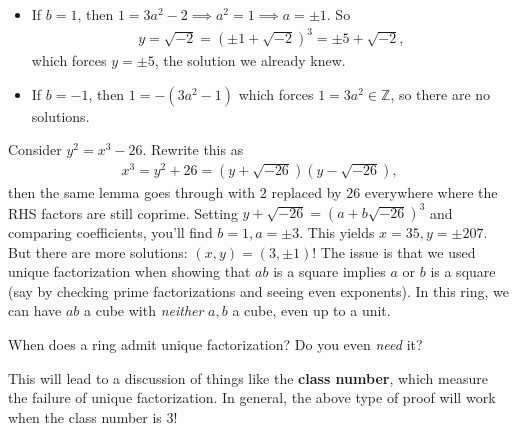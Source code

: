 \begin{example}[Fermat]
\begin{itemize}
\item
  If \(b=1\), then \(1 = 3a^2 -2 \implies a^2 = 1 \implies a = \pm 1\).
  So
  \begin{align*}
  y = \sqrt{-2} = (\pm 1 + \sqrt{-2} )^3 = \pm 5 + \sqrt{-2}
  ,\end{align*}
  which forces \(y=\pm 5\), the solution we already knew.
\item
  If \(b = -1\), then \(1 = -(3a^2 - 1)\) which forces
  \(1=3a^2 \in {\mathbb{Z}}\), so there are no solutions.
\end{itemize}

\end{example}

\begin{example}[?]

Consider \(y^2 = x^3 - 26\). Rewrite this as
\begin{align*}
x^3 = y^2 + 26 = (y + \sqrt{-26} )(y - \sqrt{-26} )
,\end{align*}
then the same lemma goes through with \(2\) replaced by \(26\)
everywhere where the RHS factors are still coprime. Setting
\(y + \sqrt{-26} = (a + b \sqrt{-26} )^3\) and comparing coefficients,
you'll find \(b=1, a = \pm 3\). This yields \(x=35, y=\pm 207\). But
there are more solutions: \((x, y) = (3, \pm 1)\)! The issue is that we
used unique factorization when showing that \(ab\) is a square implies
\(a\) or \(b\) is a square (say by checking prime factorizations and
seeing even exponents). In this ring, we can have \(ab\) a cube with
\emph{neither} \(a,b\) a cube, even up to a unit.

\end{example}

\begin{question}

When does a ring admit unique factorization? Do you even \emph{need} it?

\end{question}

This will lead to a discussion of things like the \textbf{class number},
which measure the failure of unique factorization. In general, the above
type of proof will work when the class number is 3!

\cleardoublepage

\renewcommand{\listtheoremname}{}
\listoftheorems[ignoreall,show={definition}, numwidth=3.5em]
\cleardoublepage

\renewcommand{\listtheoremname}{}
\listoftheorems[ignoreall,show={theorem,proposition}, numwidth=3.5em]
\cleardoublepage

\renewcommand{\listtheoremname}{}
\listoftheorems[ignoreall,show={exercise}, numwidth=3.5em]
\cleardoublepage

\listoffigures
\cleardoublepage


\printbibliography[title=Bibliography]




